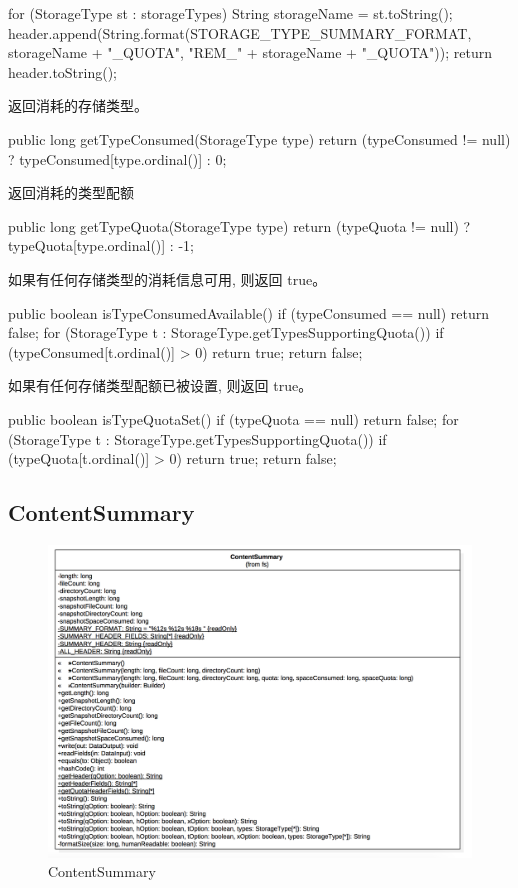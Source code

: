 \begin{java}
\begin{java}
{  for (StorageType st : storageTypes) {
    String storageName = st.toString();
    header.append(String.format(STORAGE_TYPE_SUMMARY_FORMAT,
        storageName + "_QUOTA", "REM_" + storageName + "_QUOTA"));
  }
  return header.toString();
}
\end{java}
返回消耗的存储类型。
\begin{java}
public long getTypeConsumed(StorageType type) {
  return (typeConsumed != null) ? typeConsumed[type.ordinal()] : 0;
}
\end{java}
返回消耗的类型配额
\begin{java}
public long getTypeQuota(StorageType type) {
  return (typeQuota != null) ? typeQuota[type.ordinal()] : -1;
}
\end{java}
如果有任何存储类型的消耗信息可用, 则返回 true。
\begin{java}
public boolean isTypeConsumedAvailable() {
  if (typeConsumed == null) {
    return false;
  }
  for (StorageType t : StorageType.getTypesSupportingQuota()) {
    if (typeConsumed[t.ordinal()] > 0) {
      return true;
    }
  }
  return false;
}
\end{java}
如果有任何存储类型配额已被设置, 则返回 true。
\begin{java}
public boolean isTypeQuotaSet() {
  if (typeQuota == null) {
    return false;
  }
  for (StorageType t : StorageType.getTypesSupportingQuota()) {
    if (typeQuota[t.ordinal()] > 0) {
      return true;
    }
  }
  return false;
}
\end{java}


\subsection{ContentSummary}

\begin{figure}
\centering
\includegraphics[width =1\linewidth]{uml/outputstream/9.png}
\caption{ContentSummary}
\label{fig:ContentSummary}
\end{figure}


\end{java}
